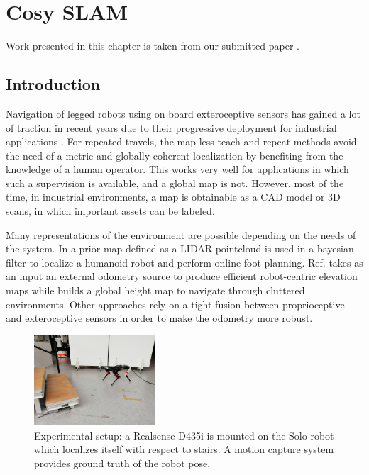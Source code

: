 \chapter{Cosy SLAM}
\minitoc

Work presented in this chapter is taken from our submitted paper \cite{debeunne2021cosyslam}.

\section{Introduction}
Navigation of legged robots using on board exteroceptive sensors has gained a lot of traction in recent years due to their progressive deployment for 
industrial applications \cite{bellicoso2018advances}. 
For repeated travels, the map-less teach and repeat methods \cite{furgale2010visual, mattamala2021learning} avoid the need of a metric and globally coherent localization 
by benefiting from the knowledge of a human operator. This works very well for applications in which such a supervision is available, and a global map is not. 
However, most of the time, in industrial environments, a map is obtainable as a CAD model or 3D scans, in which important assets can be labeled.

Many representations of the environment are possible depending on the needs of the system. In \cite{fallon2014drift} a prior map defined as a LIDAR pointcloud is 
used in a bayesian filter to localize a humanoid robot and perform online foot planning. Ref. \cite{Fankhauser2018ProbabilisticTerrainMapping} takes as an input 
an external odometry source to produce efficient robot-centric elevation maps while \cite{ kim2020vision} builds a global height map to navigate through cluttered 
environments. Other approaches \cite{wisth2021vilens} rely on a tight fusion between proprioceptive and exteroceptive sensors in order to make the odometry more robust. 

\begin{figure}%
  \centering
  \includegraphics[width=0.40\textwidth]{figures/cosyslam/solo_closer_small.png}
  \caption{Experimental setup: a Realsense D435i is mounted on the Solo robot which localizes itself with respect to stairs. A motion capture system provides ground 
            truth of the robot pose.}
  \label{fig:solo_and_stairs}
\end{figure}

